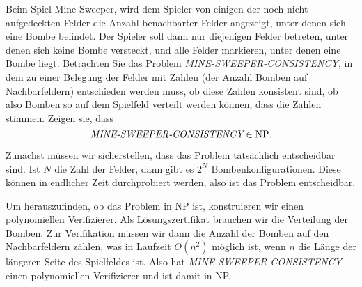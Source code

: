 Beim Spiel Mine-Sweeper, wird dem Spieler von einigen der noch nicht
aufgedeckten Felder die Anzahl benachbarter Felder angezeigt, unter
denen sich eine Bombe befindet. Der Spieler soll dann nur diejenigen
Felder betreten, unter denen sich keine Bombe versteckt, und alle
Felder markieren, unter denen eine Bombe liegt. Betrachten Sie das
Problem {\it MINE-SWEEPER-CONSISTENCY}, in dem zu einer Belegung der
Felder mit Zahlen (der Anzahl Bomben auf Nachbarfeldern) entschieden
werden muss, ob diese Zahlen konsistent sind, ob also Bomben so
auf dem Spielfeld verteilt werden können, dass die Zahlen stimmen.
Zeigen sie, dass
\[
\text{\it MINE-SWEEPER-CONSISTENCY}\in \text{NP}.
\]

\begin{loesung}
Zunächst müssen wir sicherstellen, dass das Problem tatsächlich
entscheidbar sind.
Ist $N$ die Zahl der Felder, dann gibt es $2^N$ Bombenkonfigurationen.
Diese können in endlicher Zeit durchprobiert werden, also ist das
Problem entscheidbar.

Um herauszufinden, ob das Problem in NP ist, konstruieren wir
einen polynomiellen Verifizierer.
Als Lösungszertifikat brauchen wir die Verteilung der Bomben.
Zur Verifikation müssen wir dann die Anzahl der Bomben auf den
Nachbarfeldern zählen, was in Laufzeit $O(n^2)$ möglich ist,
wenn $n$ die Länge der längeren Seite des Spielfeldes ist.
Also hat
{\it MINE-SWEEPER-CONSISTENCY} einen polynomiellen Verifizierer und
ist damit in NP.
\end{loesung}
